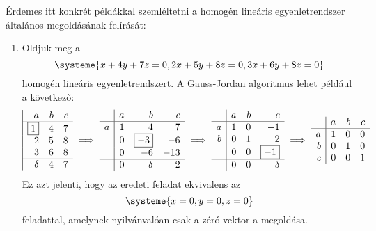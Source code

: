 \documentclass[9pt, a4paper, showtrims]{memoir}
\theoremstyle{plain}
\theoremstyle{remark}
\theoremstyle{definition}
\begin{document}
Érdemes itt konkrét példákkal szemléltetni a homogén lineáris egyenletrendszer általános megoldásának felírását:
\begin{enumerate}
    \item 
        Oldjuk meg a 
        \[
            \systeme{ x+4y+7z=0,
                2x+5y+8z=0,
                3x+6y+8z=0
            }
        \]
        homogén  lineáris egyenletrendszert.
        A Gauss-Jordan algoritmus  lehet például a következő:
        \[
            \begin{array}{|rrr}
                a&b&c\\
                \hline
                \boxed{1}&4&7\\
                2&5&8\\
                3&6&8\\
                \hline
                \delta&4&7
            \end{array}
            \implies
            \begin{array}{r|rrr}
                &a&b&c\\
                \hline
                a &  1&4&7\\
                &  0&\boxed{-3}&-6\\
                &  0&-6&-13\\
                \hline
                &  0&\delta&2
            \end{array}
            \implies
            \begin{array}{r|rrr}
                &a&b&c\\
                \hline
                a &  1&0&-1\\
                b &  0&1&2\\
                &  0&0&\boxed{-1}\\
                \hline
                &  0&0&\delta
            \end{array}
            \implies
            \begin{array}{r|rrr}
                &a&b&c\\
                \hline
                a &  1&0&0\\
                b &  0&1&0\\
                c &  0&0&1
            \end{array}
        \]
        Ez azt jelenti, hogy az eredeti feladat ekvivalens az
        \[\systeme{x=0,y=0,z=0}\]
        feladattal, amelynek nyilvánvalóan csak a zéró vektor a megoldása.

\end{enumerate}
\end{document}

